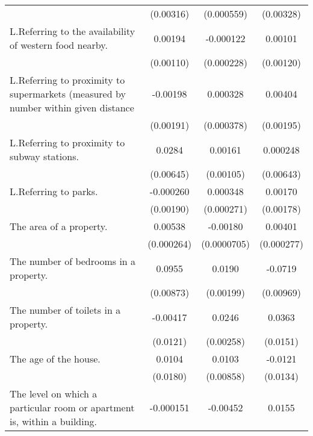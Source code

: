 {\begin{tabular}{l*{3}{c}}
                    &   (0.00316)         &  (0.000559)         &   (0.00328)         \\
\addlinespace
L.Referring to the availability of western food nearby.&     0.00194\sym{*}  &   -0.000122         &     0.00101         \\
                    &   (0.00110)         &  (0.000228)         &   (0.00120)         \\
\addlinespace
L.Referring to proximity to supermarkets (measured by number within given distance&    -0.00198         &    0.000328         &     0.00404\sym{**} \\
                    &   (0.00191)         &  (0.000378)         &   (0.00195)         \\
\addlinespace
L.Referring to proximity to subway stations.&      0.0284\sym{***}&     0.00161         &    0.000248         \\
                    &   (0.00645)         &   (0.00105)         &   (0.00643)         \\
\addlinespace
L.Referring to parks.&   -0.000260         &    0.000348         &     0.00170         \\
                    &   (0.00190)         &  (0.000271)         &   (0.00178)         \\
\addlinespace
The area of a property.&     0.00538\sym{***}&    -0.00180\sym{***}&     0.00401\sym{***}\\
                    &  (0.000264)         & (0.0000705)         &  (0.000277)         \\
\addlinespace
The number of bedrooms in a property.&      0.0955\sym{***}&      0.0190\sym{***}&     -0.0719\sym{***}\\
                    &   (0.00873)         &   (0.00199)         &   (0.00969)         \\
\addlinespace
The number of toilets in a property.&    -0.00417         &      0.0246\sym{***}&      0.0363\sym{**} \\
                    &    (0.0121)         &   (0.00258)         &    (0.0151)         \\
\addlinespace
The age of the house.&      0.0104         &      0.0103         &     -0.0121         \\
                    &    (0.0180)         &   (0.00858)         &    (0.0134)         \\
\addlinespace
The level on which a particular room or apartment is, within a building.&   -0.000151         &    -0.00452\sym{***}&      0.0155\sym{***}\\

\end{tabular}}

